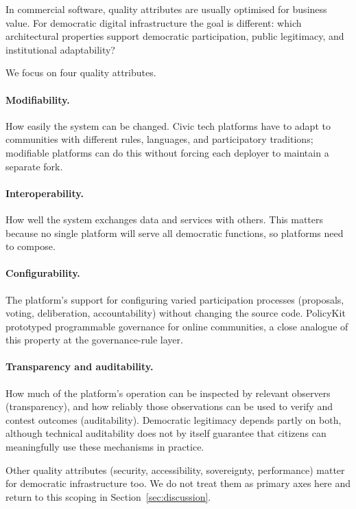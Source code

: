 \documentclass[11pt,a4paper]{article}
\begin{document}
In commercial software, quality attributes are usually optimised for business value. For democratic digital infrastructure the goal is different: which architectural properties support democratic participation, public legitimacy, and institutional adaptability?

We focus on four quality attributes.

\paragraph{Modifiability.} How easily the system can be changed. Civic tech platforms have to adapt to communities with different rules, languages, and participatory traditions; modifiable platforms can do this without forcing each deployer to maintain a separate fork.

\paragraph{Interoperability.} How well the system exchanges data and services with others. This matters because no single platform will serve all democratic functions, so platforms need to compose.

\paragraph{Configurability.} The platform's support for configuring varied participation processes (proposals, voting, deliberation, accountability) without changing the source code. PolicyKit \citep{zhang2020policykit} prototyped programmable governance for online communities, a close analogue of this property at the governance-rule layer.

\paragraph{Transparency and auditability.} How much of the platform's operation can be inspected by relevant observers (transparency), and how reliably those observations can be used to verify and contest outcomes (auditability). Democratic legitimacy depends partly on both, although technical auditability does not by itself guarantee that citizens can meaningfully use these mechanisms in practice.

Other quality attributes (security, accessibility, sovereignty, performance) matter for democratic infrastructure too. We do not treat them as primary axes here and return to this scoping in Section~\ref{sec:discussion}.
\end{document}

